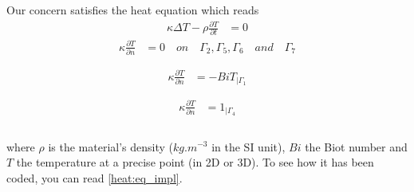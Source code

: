 Our concern satisfies the heat equation which reads 
\begin{equation}
\label{heat:eq}
   \begin{split}
      \kappa \Delta T - \displaystyle{\rho \frac{ \partial T}{\partial t}}  & = 0
  \end{split}
\end{equation}
\begin{equation}
\label{hom_neu}
   \begin{split}
      \displaystyle{ \kappa \frac{\partial T}{\partial n}} & =  0 \quad on \quad \Gamma_2,\Gamma_5, \Gamma_6 \quad and \quad \Gamma_7 \\ \\ 
  \end{split}
\end{equation}
\begin{equation}
\label{classic_neu}
   \begin{split}
      \displaystyle{ \kappa \frac{\partial T}{\partial n}} & = - Bi T_{ | \Gamma_1 } \\ \\
  \end{split}
\end{equation}
\begin{equation}
\label{nonhom_neu}
   \begin{split}
      \displaystyle{ \kappa \frac{\partial T}{\partial n}} & =  1_{| \Gamma_4} \\ \\
  \end{split}
\end{equation}

where $\rho$ is the material's density ($kg.m^{-3}$ in the SI unit), $Bi$ the Biot number and $T$ the temperature at a precise point (in 2D or 3D). To see how it has been coded, you can read \ref{heat:eq_impl}.

%


